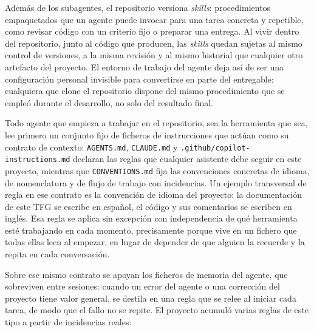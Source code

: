 Además de los subagentes, el repositorio versiona \textit{skills}: procedimientos empaquetados
que un agente puede invocar para una tarea concreta y repetible, como revisar código con un
criterio fijo o preparar una entrega. Al vivir dentro del repositorio, junto al código que
producen, las \textit{skills} quedan sujetas al mismo control de versiones, a la misma revisión
y al mismo historial que cualquier otro artefacto del proyecto. El entorno de trabajo del
agente deja así de ser una configuración personal invisible para convertirse en parte del
entregable: cualquiera que clone el repositorio dispone del mismo procedimiento que se empleó
durante el desarrollo, no solo del resultado final.

Todo agente que empieza a trabajar en el repositorio, sea la herramienta que sea, lee primero
un conjunto fijo de ficheros de instrucciones que actúan como su contrato de contexto:
\texttt{AGENTS.md}, \texttt{CLAUDE.md} y \texttt{.github/copilot-instructions.md} declaran las
reglas que cualquier asistente debe seguir en este proyecto, mientras que
\texttt{CONVENTIONS.md} fija las convenciones concretas de idioma, de nomenclatura y de flujo de
trabajo con incidencias. Un ejemplo transversal de regla en ese contrato es la convención de
idioma del proyecto: la documentación de este TFG se escribe en español, el código y sus
comentarios se escriben en inglés. Esa regla se aplica sin excepción con independencia de qué
herramienta esté trabajando en cada momento, precisamente porque vive en un fichero que todas
ellas leen al empezar, en lugar de depender de que alguien la recuerde y la repita en cada
conversación.

Sobre ese mismo contrato se apoyan los ficheros de memoria del agente, que sobreviven entre
sesiones: cuando un error del agente o una corrección del proyecto tiene valor general, se
destila en una regla que se relee al iniciar cada tarea, de modo que el fallo no se repite. El
proyecto acumuló varias reglas de este tipo a partir de incidencias reales:

